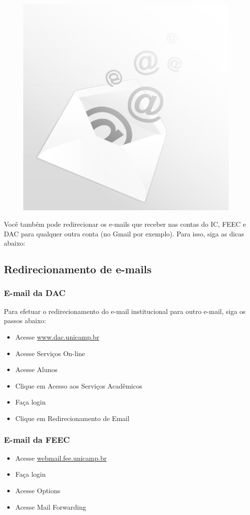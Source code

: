 \begin{figure}[b!]
    \centering
    \includegraphics[width=.3\textwidth]{img/alem_da_graduacao/email.jpg}
\end{figure}
Você também pode redirecionar os e-mails que receber nas contas do IC, FEEC e
DAC para qualquer outra conta (no Gmail por exemplo). Para isso, siga as dicas
abaixo:

\subsection{Redirecionamento de e-mails}

\subsubsection*{E-mail da DAC}
Para efetuar o redirecionamento do e-mail institucional para outro e-mail, siga
os passos abaixo:

\begin{itemize}
    \item  Acesse \url{www.dac.unicamp.br}
    \item  Acesse Serviços On-line
    \item  Acesse Alunos
    \item  Clique em Acesso aos Serviços Acadêmicos
    \item  Faça login
    \item  Clique em Redirecionamento de Email
\end{itemize}

\subsubsection*{E-mail da FEEC}

\begin{itemize}
    \item  Acesse \url{webmail.fee.unicamp.br}
    \item  Faça login
    \item  Acesse Options
    \item  Acesse Mail Forwarding
\end{itemize}

